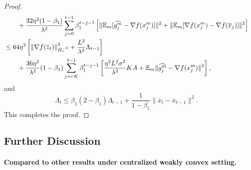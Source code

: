 \documentclass{article} %
\numberwithin{equation}{section}
\begin{document}
\begin{proof}
\begin{equation}
\begin{aligned}
            &\qquad + \frac{32\eta^2(1-\beta_1)}{\lambda^2}\sum_{j=0}^{t-1}\beta_1^{t-j-1}\left[ \| \mathbb{E}_m[\widehat{g_j^m}-\nabla f(x_j^m)] \|^2 
            + \|\mathbb{E}_m[\nabla f(x_j^m)-\nabla f(\overline{x}_j)] \|^2 \right] \\
            &\leq 64\eta^2\left[ \left\|\nabla f(\overline{z}_t)\right\|_{H_r^{-2}}^2 + \frac{L^2}{\lambda^2}\Lambda_{t-1}\right] \\
            &\qquad + \frac{36\eta^2}{\lambda^2}(1-\beta_1)\sum_{j=rK}^{t-1}\beta_1^{t-j-1} \left[\frac{\eta^2L^2\sigma^2}{\lambda^2}KA+\mathbb{E}_m\|\widehat{g_j^m}-\nabla f(x_j^m)\|^2\right],
        \end{aligned}
    \end{equation}
    and
    \begin{equation}
        \Lambda_t \leq \beta_1(2-\beta_1)\Lambda_{t-1} + \frac{1}{1-\beta_1}\|\overline{x}_t-\overline{x}_{t-1}\|^2.
    \end{equation}
    This completes the proof.
\end{proof}

\subsection{Further Discussion}\label{app:subsec:discuss_local_adam}

\paragraph{Compared to other results under centralized weakly convex setting.}
\end{document}
